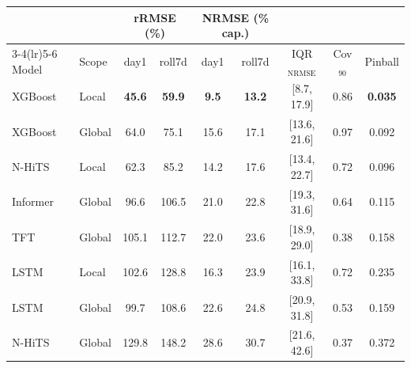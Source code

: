 \begin{tabular}{llccccccc}
\toprule
 &  & \multicolumn{2}{c}{rRMSE (\%)} & \multicolumn{2}{c}{NRMSE (\% cap.)} & & & \\
\cmidrule(lr){3-4}\cmidrule(lr){5-6}
Model & Scope & day1 & roll7d & day1 & roll7d & IQR$_{\text{NRMSE}}$ & Cov$_{90}$ & Pinball \\
\midrule
XGBoost & Local & \textbf{45.6} & \textbf{59.9} & \textbf{9.5} & \textbf{13.2} & [8.7, 17.9] & 0.86 & \textbf{0.035} \\
XGBoost & Global & 64.0 & 75.1 & 15.6 & 17.1 & [13.6, 21.6] & 0.97 & 0.092 \\
N-HiTS & Local & 62.3 & 85.2 & 14.2 & 17.6 & [13.4, 22.7] & 0.72 & 0.096 \\
Informer & Global & 96.6 & 106.5 & 21.0 & 22.8 & [19.3, 31.6] & 0.64 & 0.115 \\
TFT & Global & 105.1 & 112.7 & 22.0 & 23.6 & [18.9, 29.0] & 0.38 & 0.158 \\
LSTM & Local & 102.6 & 128.8 & 16.3 & 23.9 & [16.1, 33.8] & 0.72 & 0.235 \\
LSTM & Global & 99.7 & 108.6 & 22.6 & 24.8 & [20.9, 31.8] & 0.53 & 0.159 \\
N-HiTS & Global & 129.8 & 148.2 & 28.6 & 30.7 & [21.6, 42.6] & 0.37 & 0.372 \\
\bottomrule
\end{tabular}